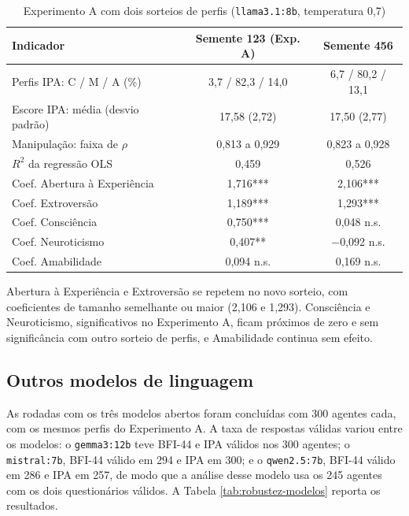 \begin{table}[htb]
    \caption{Experimento A com dois sorteios de perfis (\texttt{llama3.1:8b}, temperatura 0,7)}
    \label{tab:robustez-seed}
    \centering
    \begin{tabular}{lcc}
        \toprule
        Indicador & Semente 123 (Exp. A) & Semente 456 \\
        \midrule
        Perfis IPA: C / M / A (\%) & 3,7 / 82,3 / 14,0 & 6,7 / 80,2 / 13,1 \\
        Escore IPA: média (desvio padrão) & 17,58 (2,72) & 17,50 (2,77) \\
        Manipulação: faixa de $\rho$ & 0,813 a 0,929 & 0,823 a 0,928 \\
        $R^2$ da regressão OLS & 0,459 & 0,526 \\
        \midrule
        Coef. Abertura à Experiência & 1,716*** & 2,106*** \\
        Coef. Extroversão & 1,189*** & 1,293*** \\
        Coef. Consciência & 0,750*** & 0,048 n.s. \\
        Coef. Neuroticismo & 0,407** & $-$0,092 n.s. \\
        Coef. Amabilidade & 0,094 n.s. & 0,169 n.s. \\
        \bottomrule
    \end{tabular}
\end{table}

Abertura à Experiência e Extroversão se repetem no novo sorteio, com
coeficientes de tamanho semelhante ou maior (2,106 e 1,293). Consciência
e Neuroticismo, significativos no Experimento A, ficam próximos de zero e
sem significância com outro sorteio de perfis, e Amabilidade continua sem
efeito.

\subsection{Outros modelos de linguagem}

As rodadas com os três modelos abertos foram concluídas com 300 agentes cada, com
os mesmos perfis do Experimento A. A taxa de respostas válidas variou
entre os modelos: o \texttt{gemma3:12b} teve BFI-44 e IPA válidos nos 300
agentes; o \texttt{mistral:7b}, BFI-44 válido em 294 e IPA em 300; e o
\texttt{qwen2.5:7b}, BFI-44 válido em 286 e IPA em 257, de modo que a
análise desse modelo usa os 245 agentes com os dois questionários
válidos. A Tabela \ref{tab:robustez-modelos} reporta os resultados.

